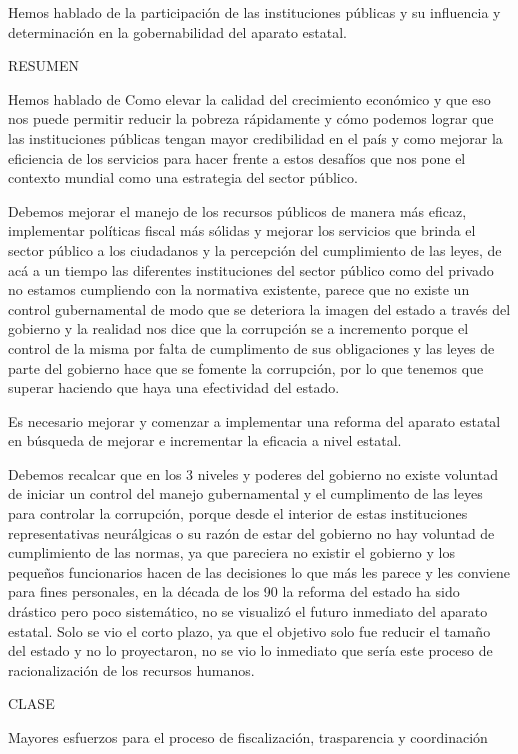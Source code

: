\documentclass[
  a4paper,
]{article}
\begin{document}
Hemos hablado de la participación de las instituciones públicas y su
influencia y determinación en la gobernabilidad del aparato estatal.

RESUMEN

Hemos hablado de Como elevar la calidad del crecimiento económico y que
eso nos puede permitir reducir la pobreza rápidamente y cómo podemos
lograr que las instituciones públicas tengan mayor credibilidad en el
país y como mejorar la eficiencia de los servicios para hacer frente a
estos desafíos que nos pone el contexto mundial como una estrategia del
sector público.

Debemos mejorar el manejo de los recursos públicos de manera más eficaz,
implementar políticas fiscal más sólidas y mejorar los servicios que
brinda el sector público a los ciudadanos y la percepción del
cumplimiento de las leyes, de acá a un tiempo las diferentes
instituciones del sector público como del privado no estamos cumpliendo
con la normativa existente, parece que no existe un control
gubernamental de modo que se deteriora la imagen del estado a través del
gobierno y la realidad nos dice que la corrupción se a incremento porque
el control de la misma por falta de cumplimento de sus obligaciones y
las leyes de parte del gobierno hace que se fomente la corrupción, por
lo que tenemos que superar haciendo que haya una efectividad del estado.

Es necesario mejorar y comenzar a implementar una reforma del aparato
estatal en búsqueda de mejorar e incrementar la eficacia a nivel
estatal.

Debemos recalcar que en los 3 niveles y poderes del gobierno no existe
voluntad de iniciar un control del manejo gubernamental y el cumplimento
de las leyes para controlar la corrupción, porque desde el interior de
estas instituciones representativas neurálgicas o su razón de estar del
gobierno no hay voluntad de cumplimiento de las normas, ya que pareciera
no existir el gobierno y los pequeños funcionarios hacen de las
decisiones lo que más les parece y les conviene para fines personales,
en la década de los 90 la reforma del estado ha sido drástico pero poco
sistemático, no se visualizó el futuro inmediato del aparato estatal.
Solo se vio el corto plazo, ya que el objetivo solo fue reducir el
tamaño del estado y no lo proyectaron, no se vio lo inmediato que sería
este proceso de racionalización de los recursos humanos.

CLASE

Mayores esfuerzos para el proceso de fiscalización, trasparencia y
coordinación
\end{document}
